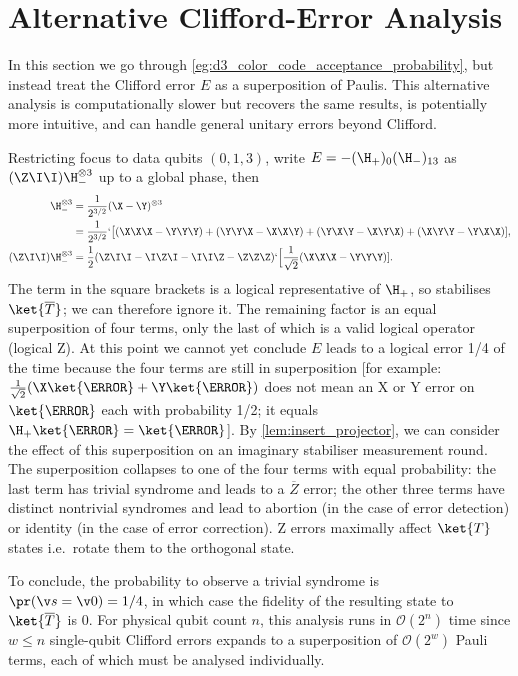\section{Alternative Clifford-Error Analysis}
\label{sec:alternative_clifford_error_analysis}
In this section we go through
\cref{eg:d3_color_code_acceptance_probability},
but instead treat the Clifford error $E$
as a superposition of Paulis.
This alternative analysis is computationally slower but
recovers the same results,
is potentially more intuitive,
and can handle general unitary errors beyond Clifford.

Restricting focus to data qubits $(0, 1, 3)$,
write $E =-(\H_+)_0 (\H_-)_{1 3}$ as $(\Z\I\I) \H_-^{\otimes 3}$
up to a global phase, then
\begin{align}
	\H_-^{\otimes 3}
	&=\frac{1}{2^{3/2}} (\X -\Y)^{\otimes 3} \notag \\
	&=\frac{1}{2^{3/2}} `\big[
		(\X\X\X -\Y\Y\Y) +
		(\Y\Y\X -\X\X\Y) +
		(\Y\X\Y -\X\Y\X) +
		(\X\Y\Y -\Y\X\X)], \notag \\
	(\Z\I\I) \H_-^{\otimes 3}
	&=\frac{1}{2}(\Z\I\I -\I\Z\I -\I\I\Z -\Z\Z\Z)
	`\Big[\frac{1}{\sqrt{2}}(\X\X\X -\Y\Y\Y)].
\end{align}
The term in the square brackets
is a logical representative of $\H_+$,
so stabilises $\ket{\overline{T}}$;
we can therefore ignore it.
The remaining factor is
an equal superposition of four terms,
only the last of which is a valid logical operator (logical Z).
At this point we cannot yet conclude
$E$ leads to a logical error 1/4 of the time
because the four terms are still in superposition
[for example:
$\frac{1}{\sqrt{2}}(\X\ket{\T} +\Y\ket{\T})$ does not mean
an X or Y error on $\ket{\T}$ each with probability 1/2;
it equals $\H_+\ket{\T} =\ket{\T}$].
By \cref{lem:insert_projector},
we can consider the effect of this superposition on
an imaginary stabiliser measurement round.
The superposition collapses to one of the four terms
with equal probability:
the last term has trivial syndrome and leads to a $\overline{Z}$ error;
the other three terms have distinct nontrivial syndromes and lead to
abortion (in the case of error detection)
or identity (in the case of error correction).
Z errors maximally affect $\ket{T}$ states
i.e.\ rotate them to the orthogonal state.

To conclude,
the probability to observe a trivial syndrome is
$\pr(\v s =\v 0) =1/4$,
in which case the fidelity of
the resulting state to $\ket{\overline{T}}$ is 0.
For physical qubit count $n$,
this analysis runs in $\mathcal O(2^n)$ time
since $w \le n$ single-qubit Clifford errors
expands to a superposition of $\mathcal O(2^w)$ Pauli terms,
each of which must be analysed individually.